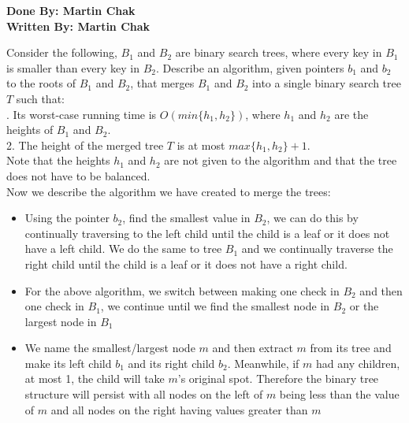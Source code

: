 \documentclass[20pt]{article}
\begin{document}
\textbf{Done By: Martin Chak}\\
\textbf{Written By: Martin Chak}\\

\begin{text}
    Consider the following, $B_1$ and $B_2$ are binary search trees, where every key in $B_1$ is smaller than every key in $B_2$. Describe an algorithm, given pointers $b_1$ and $b_2$ to the roots of $B_1$ and $B_2$, that merges $B_1$ and $B_2$ into a single binary search tree $T$ such that:\\
    
    . Its worst-case running time is $O(min\{h_1, h_2\})$, where $h_1$ and $h_2$ are the heights of $B_1$ and $B_2$.\\
    2. The height of the merged tree $T$ is at most $max\{h_1, h_2\} + 1$.\\
    
    \noindent
    Note that the heights $h_1$ and $h_2$ are not given to the algorithm and that the tree does not have to be balanced.\\
    
    \noindent
    Now we describe the algorithm we have created to merge the trees:
\end{text}

\begin{itemize}
    \item Using the pointer $b_2$, find the smallest value in $B_2$, we can do this by continually traversing to the left child until the child is a leaf or it does not have a left child. We do the same to tree $B_1$ and we continually traverse the right child until the child is a leaf or it does not have a right child.
    \item For the above algorithm, we switch between making one check in $B_2$ and then one check in $B_1$, we continue until we find the smallest node in $B_2$ or the largest node in $B_1$
    \item We name the smallest/largest node $m$ and then extract $m$ from its tree and make its left child $b_1$ and its right child $b_2$. Meanwhile, if $m$ had any children, at most 1, the child will take $m$'s original spot. Therefore the binary tree structure will persist with all nodes on the left of $m$ being less than the value of $m$ and all nodes on the right having values greater than $m$
\end{itemize}
\end{document}
